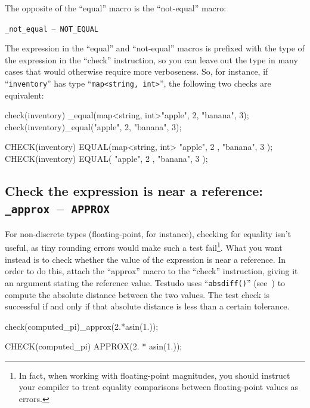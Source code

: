 \documentclass[twoside, a4paper, article]{memoir}
\newcommand*\testudocolor{\color{red!80!blue}}
\newcommand*\testudo[1]{\texttt{\testudocolor{}#1}}
\newcommand*\testudopair[2]{\testudo{#1}~--~\testudo{#2}}
\begin{document}
The opposite of the ``equal'' macro is the ``not-equal'' macro:
\begin{center}
  \testudopair{\_not\_equal}{NOT\_EQUAL}
\end{center}

The expression in the ``equal'' and ``not-equal'' macros is prefixed with the
type of the expression in the ``check'' instruction, so you can leave out the
type in many cases that would otherwise require more verboseness.  So, for
instance, if ``\texttt{inventory}'' has type ``\texttt{map<string, int>}'', the
following two checks are equivalent:
\begin{cpplisting}
check(inventory)
  _equal(map<string, int>{{"apple", 2}, {"banana", 3}});
check(inventory)_equal({{"apple", 2}, {"banana", 3}});
\end{cpplisting}

\begin{cpplisting}
CHECK(inventory)
  EQUAL(map<string, int>{ { "apple", 2 }, { "banana", 3 } });
CHECK(inventory) EQUAL({ { "apple", 2 }, { "banana", 3 } });
\end{cpplisting}


\subsection{Check the expression is near a reference:
  \testudopair{\_approx}{APPROX}}
\label{sec:check-expression-near-reference}

For non-discrete types (floating-point, for instance), checking for equality
isn't useful, as tiny rounding errors would make such a test fail\footnote{In
  fact, when working with floating-point magnitudes, you should instruct your
  compiler to treat equality comparisons between floating-point values as
  errors.}.  What you want instead is to check whether the value of the
expression is near a reference.  In order to do this, attach the ``approx''
macro to the ``check'' instruction, giving it an argument stating the reference
value.  Testudo uses ``\texttt{absdiff()}''
(see~) to compute the absolute distance
between the two values.  The test check is successful if and only if that
absolute distance is less than a certain tolerance.

\begin{cpplisting}
check(computed_pi)_approx(2.*asin(1.));
\end{cpplisting}

\begin{cpplisting}
CHECK(computed_pi) APPROX(2. * asin(1.));
\end{cpplisting}
\end{document}
